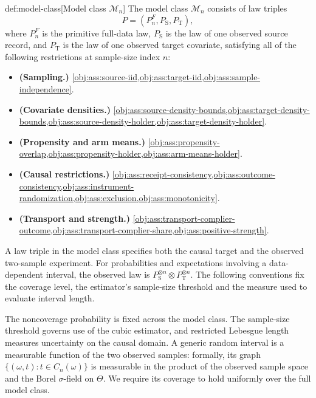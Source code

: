 \documentclass[11pt]{article}
\begin{document}
\begin{definitionv}{def:model-class}[Model class $\mathcal M_n$]
The model class \(\mathcal M_n\) consists of law triples
\[
P=(P_n^F,P_{\mathrm S},P_{\mathrm T}),
\]
where \(P_n^F\) is the primitive full-data law, \(P_{\mathrm S}\) is the law of one observed source record, and \(P_{\mathrm T}\) is the law of one observed target covariate, satisfying all of the following restrictions at sample-size index \(n\):
\begin{itemize}
\item \textbf{(Sampling.)} \cref{obj:ass:source-iid,obj:ass:target-iid,obj:ass:sample-independence}.
\item \textbf{(Covariate densities.)} \cref{obj:ass:source-density-bounds,obj:ass:target-density-bounds,obj:ass:source-density-holder,obj:ass:target-density-holder}.
\item \textbf{(Propensity and arm means.)} \cref{obj:ass:propensity-overlap,obj:ass:propensity-holder,obj:ass:arm-means-holder}.
\item \textbf{(Causal restrictions.)} \cref{obj:ass:receipt-consistency,obj:ass:outcome-consistency,obj:ass:instrument-randomization,obj:ass:exclusion,obj:ass:monotonicity}.
\item \textbf{(Transport and strength.)} \cref{obj:ass:transport-complier-outcome,obj:ass:transport-complier-share,obj:ass:positive-strength}.
\end{itemize}
\end{definitionv}

A law triple  in the model class  specifies both the causal target and the observed two-sample experiment. For probabilities and expectations involving a data-dependent interval, the observed law is \(P_{\mathrm S}^{\otimes n}\otimes P_{\mathrm T}^{\otimes n}\). The following conventions fix the coverage level, the estimator's sample-size threshold and the measure used to evaluate interval length.



The noncoverage probability  is fixed across the model class. The sample-size threshold  governs use of the cubic estimator, and restricted Lebesgue length  measures uncertainty on the causal domain. A generic random interval  is a measurable function of the two observed samples: formally, its graph \(\{(\omega,t):t\in C_n(\omega)\}\) is measurable in the product of the observed sample space and the Borel \(\sigma\)-field on \(\Theta\). We require its coverage to hold uniformly over the full model class.
\end{document}
